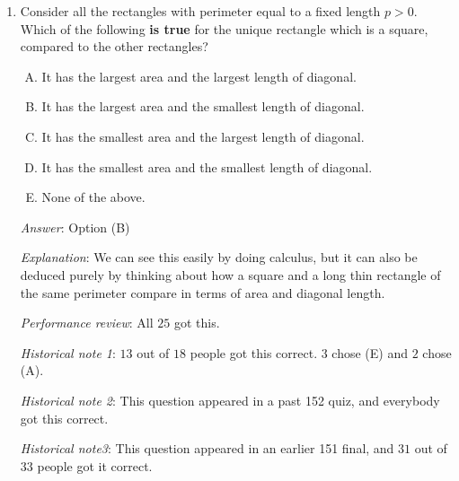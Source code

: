 \documentclass[10pt]{amsart}
\begin{document}
\begin{enumerate}
  {\em Historical note 2}: This question appeared in a Math 152 quiz. At
  the time, $5$ out of $15$ people got this correct. $5$ people chose
  (A), which is the converse of the statement. $2$ people chose (D)
  and $1$ person each chose (C) and (E). Thus, most people got the
  sign/direction part correct but messed up on which way the
  implication goes.

\item Consider all the rectangles with perimeter equal to a fixed
  length $p > 0$. Which of the following {\bf is true} for the unique
  rectangle which is a square, compared to the other rectangles?

  \begin{enumerate}[(A)]
  \item It has the largest area and the largest length of diagonal.
  \item It has the largest area and the smallest length of diagonal.
  \item It has the smallest area and the largest length of diagonal.
  \item It has the smallest area and the smallest length of diagonal.
  \item None of the above.
  \end{enumerate}

  {\em Answer}: Option (B)

  {\em Explanation}: We can see this easily by doing calculus, but it
  can also be deduced purely by thinking about how a square and a long
  thin rectangle of the same perimeter compare in terms of area and
  diagonal length.

  {\em Performance review}: All $25$ got this.

  {\em Historical note 1}: $13$ out of $18$ people got this
  correct. $3$ chose (E) and $2$ chose (A).

  {\em Historical note 2}: This question appeared in a past 152 quiz,
  and everybody got this correct.

  {\em Historical note3}: This question appeared in an earlier 151
  final, and $31$ out of $33$ people got it correct.


\end{enumerate}
\end{document}
